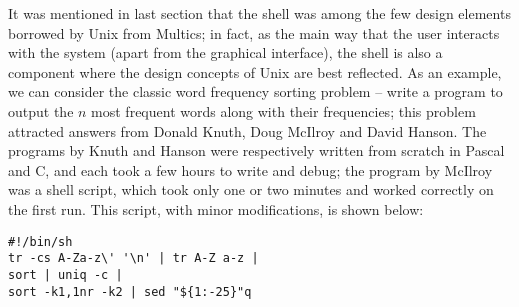 It was mentioned in last section that the shell was among the few design
elements borrowed by Unix from Multics; in fact, as the main way that the user
interacts with the system (apart from the graphical
interface), the shell is also a component where the design concepts of Unix
are best reflected.  As an example, we can consider the classic word frequency
sorting problem -- write a program to output the $n$
most frequent words along with their frequencies; this problem attracted
answers from Donald Knuth, Doug McIlroy and David Hanson.  The programs by
Knuth and Hanson were respectively written from scratch in Pascal and C, and
each took a few hours to write and debug; the program by McIlroy was a shell
script, which took only one or two minutes and worked correctly on the
first run.  This script, with minor modifications, is shown below:
\begin{quoting}
\begin{Verbatim}
#!/bin/sh
tr -cs A-Za-z\' '\n' | tr A-Z a-z |
sort | uniq -c |
sort -k1,1nr -k2 | sed "${1:-25}"q
\end{Verbatim}
\end{quoting}


